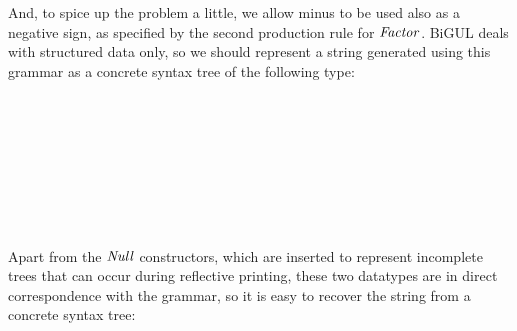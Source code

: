 And, to spice up the problem a little, we allow minus to be used also as a negative sign, as specified by the second production rule for \ensuremath{\Conid{Factor}}.
BiGUL deals with structured data only, so we should represent a string generated using this grammar as a concrete syntax tree of the following type:
\begin{hscode}\SaveRestoreHook
{}%
%
%
%
%
%
\>[B]{}\;\<[11]%
\>[11]{}\mathrel{=}{}\<[11E]%
\>[14]{}\;\;\<[E]%
\\
\>[11]{}\mid {}\<[11E]%
\>[14]{}\;\;\<[E]%
\\
\>[11]{}\mid {}\<[11E]%
\>[14]{}\;\<[E]%
\\
\>[11]{}\mid {}\<[11E]%
\>[14]{}\<[E]%
\\[\blanklineskip]%
\>[B]{}\;\<[14]%
\>[14]{}\mathrel{=}{}\<[17]%
\>[17]{}\;\<[E]%
\\
\>[14]{}\mid {}\<[17]%
\>[17]{}\;\<[E]%
\\
\>[14]{}\mid {}\<[17]%
\>[17]{}\;\<[E]%
\\
\>[14]{}\mid {}\<[17]%
\>[17]{}\<[E]%
\ColumnHook
\end{hscode}\resethooks
%
%
Apart from the \ensuremath{\Conid{Null}} constructors, which are inserted to represent incomplete trees that can occur during reflective printing, these two datatypes are in direct correspondence with the grammar, so it is easy to recover the string from a concrete syntax tree:

